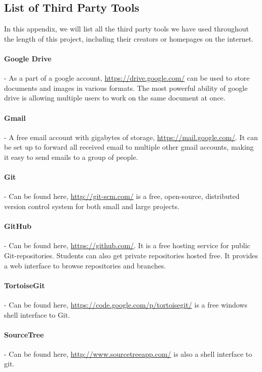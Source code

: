 \documentclass[../document]{subfiles}
\begin{document}
 

\subsection{List of Third Party Tools}
\label{third_party_tools}

In this appendix, we will list all the third party tools we have used throughout the length of this project, including their creators or homepages on the internet.

\paragraph{Google Drive} - As a part of a google account, \url{https://drive.google.com/} can be used to store documents and images in various formats. The most powerful ability of google drive is allowing multiple users to work on the same document at once.

\paragraph{Gmail} - A free email account with gigabytes of storage, \url{https://mail.google.com/}. It can be set up to forward all received email to multiple other gmail accounts, making it easy to send emails to a group of people.

\paragraph{Git} - Can be found here, \url{http://git-scm.com/} is a free, open-source, distributed version control system for both small and large projects.

\paragraph{GitHub} - Can be found here, \url{https://github.com/}. It is a free hosting service for public Git-repositories. Students can also get private repositories hosted free. It provides a web interface to browse repositories and branches.

\paragraph{TortoiseGit} - Can be found here, \url{https://code.google.com/p/tortoisegit/} is a free windows shell interface to Git.

\paragraph{SourceTree} - Can be found here, \url{http://www.sourcetreeapp.com/} is also a shell interface to git.
\end{document}
